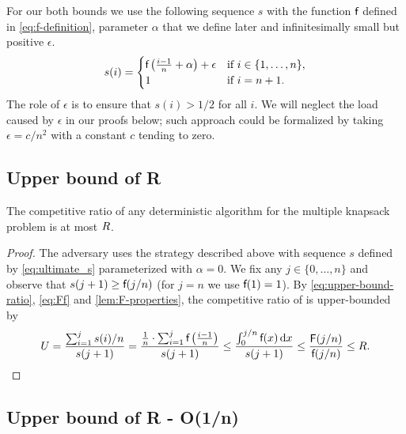 For our both bounds we use the following sequence $s$ with the function $\textsf{f}$
defined in \eqref{eq:f-definition}, parameter $\alpha$ that we define later and
infinitesimally small but positive $\epsilon$. 
\begin{equation}
  \label{eq:ultimate_s}
    s(i) = \begin{cases}
      \textsf{f} \left( \frac{i-1}{n} + \alpha \right) + \epsilon 
        & \text{if $i \in \{ 1, \ldots, n \}$}, \\
      1 & \text{if $i = n+1$}.
    \end{cases}
\end{equation}
The role of $\epsilon$ is to ensure that $s(i) > 1/2$ for all $i$. 
We will neglect the load caused by $\epsilon$ in our proofs below;
such approach could be formalized by taking $\epsilon = c/n^2$
with a constant $c$ tending to zero.



\subsection{Upper bound of R}

\begin{lemma}
\label{lem:upper-bound-weak}
The competitive ratio of any deterministic algorithm \DET for the multiple
knapsack problem is at most $R$.
\end{lemma}

\begin{proof}
The adversary uses the strategy described above
with sequence $s$ defined by \eqref{eq:ultimate_s} parameterized
with $\alpha = 0$.
We fix any $j \in \{0, \ldots, n\}$ and observe that $s(j+1) \geq \textsf{f}(j/n)$ 
(for $j = n$ we use $\textsf{f}(1) = 1$).
By \eqref{eq:upper-bound-ratio}, \eqref{eq:Ff} and \cref{lem:F-properties}, the competitive ratio of \DET is 
upper-bounded by 
\[
  U = \frac{ \sum_{i = 1}^{j} s(i)/n }{s(j+1)}
  = \frac{ \frac{1}{n} \cdot \sum_{i = 1}^{j} \textsf{f} \left( \frac{i-1}{n} \right)}
    {s(j+1)}
  \leq \frac{ \int_0^{j/n} \textsf{f} (x) \, \mathrm{d} x }{s(j+1)}
  \leq \frac{\textsf{F}(j/n)}{\textsf{f}(j/n)}
  \leq R.
\qedhere
\]
\end{proof}




\subsection{Upper bound of R - O(1/n)}


